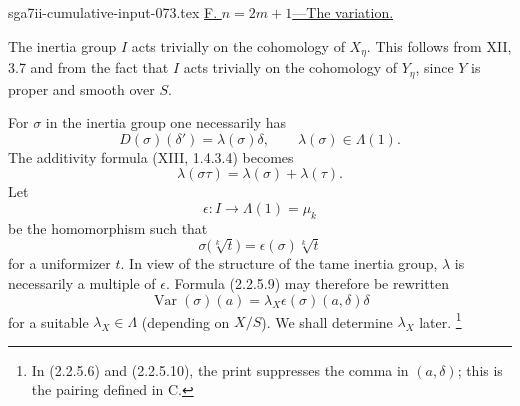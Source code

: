 \begin{filecontents*}{sga7ii-cumulative-input-073.tex}
\medskip
\noindent\underline{F. $n=2m+1$---The variation.}

The inertia group $I$ acts trivially on the cohomology of $X_\eta$.
This follows from XII, 3.7 and from the fact that $I$ acts trivially
on the cohomology of $Y_\eta$, since $Y$ is proper and smooth over
$S$.

For $\sigma$ in the inertia group one necessarily has
\begin{equation}\tag{2.2.5.9}
D(\sigma)(\delta')=\lambda(\sigma)\delta,
\qquad \lambda(\sigma)\in\Lambda(1).
\end{equation}
The additivity formula (XIII, 1.4.3.4) becomes
\[
\lambda(\sigma\tau)=\lambda(\sigma)+\lambda(\tau).
\]
Let
\[
\epsilon:I\longrightarrow\Lambda(1)=\mu_k
\]
be the homomorphism such that
\[
\sigma\bigl(\sqrt[k]{t}\bigr)
=\epsilon(\sigma)\sqrt[k]{t}
\]
for a uniformizer $t$.  In view of the structure of the tame inertia
group, $\lambda$ is necessarily a multiple of $\epsilon$.  Formula
(2.2.5.9) may therefore be rewritten
\begin{equation}\tag{2.2.5.10}
\operatorname{Var}(\sigma)(a)
=\lambda_X\epsilon(\sigma)(a,\delta)\delta
\end{equation}
for a suitable $\lambda_X\in\Lambda$ (depending on $X/S$).  We shall
determine $\lambda_X$ later.
\footnote{In (2.2.5.6) and (2.2.5.10), the print suppresses the comma
in $(a,\delta)$; this is the pairing defined in C.}
\end{filecontents*}
